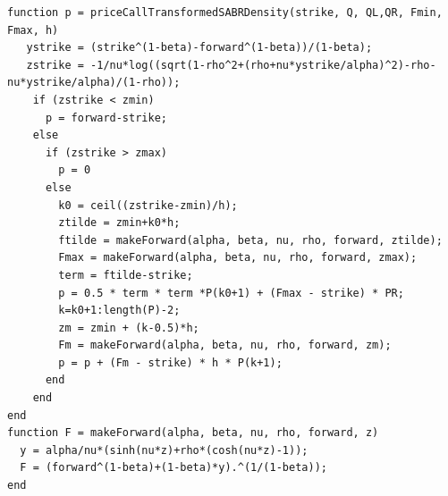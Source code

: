 \documentclass[]{rAMF2e}
\begin{document}
\begin{center}
\begin{lstlisting}
function p = priceCallTransformedSABRDensity(strike, Q, QL,QR, Fmin, Fmax, h) 
   ystrike = (strike^(1-beta)-forward^(1-beta))/(1-beta);
   zstrike = -1/nu*log((sqrt(1-rho^2+(rho+nu*ystrike/alpha)^2)-rho-nu*ystrike/alpha)/(1-rho));
    if (zstrike < zmin)
      p = forward-strike;
    else 
      if (zstrike > zmax)
        p = 0
      else
        k0 = ceil((zstrike-zmin)/h);
        ztilde = zmin+k0*h;
        ftilde = makeForward(alpha, beta, nu, rho, forward, ztilde);
        Fmax = makeForward(alpha, beta, nu, rho, forward, zmax);
        term = ftilde-strike;
        p = 0.5 * term * term *P(k0+1) + (Fmax - strike) * PR;
        k=k0+1:length(P)-2;
        zm = zmin + (k-0.5)*h;        
        Fm = makeForward(alpha, beta, nu, rho, forward, zm);     
        p = p + (Fm - strike) * h * P(k+1);
      end
    end
end
function F = makeForward(alpha, beta, nu, rho, forward, z) 
  y = alpha/nu*(sinh(nu*z)+rho*(cosh(nu*z)-1));
  F = (forward^(1-beta)+(1-beta)*y).^(1/(1-beta));
end
\end{lstlisting}
\end{center}
\end{document}
